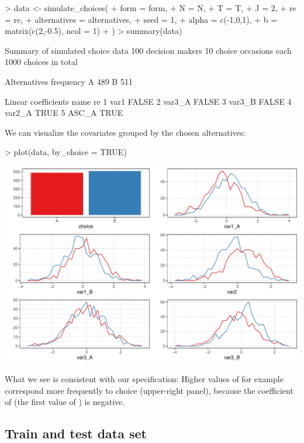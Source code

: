 \documentclass[article]{jss}
\begin{document}
\begin{Schunk}
\begin{Sinput}
> data <- simulate_choices(
+    form = form,
+    N = N,
+    T = T,
+    J = 2,
+    re = re,
+    alternatives = alternatives,
+    seed = 1,
+    alpha = c(-1,0,1),
+    b = matrix(c(2,-0.5), ncol = 1)
+  )
> summary(data)
\end{Sinput}
\begin{Soutput}
Summary of simulated choice data
100 decision makers 
10 choice occasions each 
1000 choices in total

Alternatives
  frequency
A       489
B       511

Linear coefficients
    name    re
1   var1 FALSE
2 var3_A FALSE
3 var3_B FALSE
4 var2_A  TRUE
5  ASC_A  TRUE
\end{Soutput}
\end{Schunk}

We can visualize the covariates grouped by the chosen alternatives:

\begin{Schunk}
\begin{Sinput}
> plot(data, by_choice = TRUE)
\end{Sinput}
\end{Schunk}
\includegraphics{rprobitb_oelschlaeger_bauer-data-sim-plot-by-choice}

What we see is consistent with our specification: Higher values of  for example correspond more frequently to choice  (upper-right panel), because the coefficient of  (the first value of ) is negative.

\subsection{Train and test data set} \label{subsec:train_test}
\end{document}
